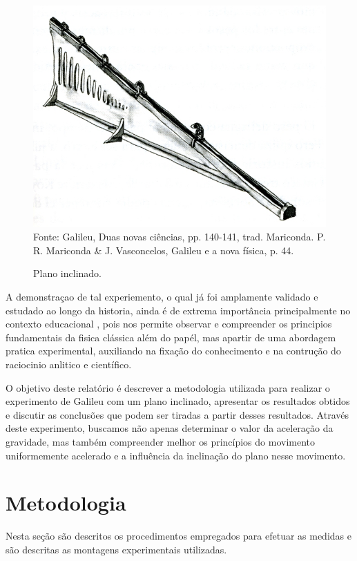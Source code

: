 \documentclass[a4paper, 12pt]{article}
\begin{document}
\begin{figure}[!htpb]
	\centering
	\caption{Plano inclinado.}
	\includegraphics[scale=0.25]{./pictures/planoInclinado.png}
	Fonte: Galileu, Duas novas ciências, pp. 140-141, trad. Mariconda. P. R. Mariconda \& J. Vasconcelos, Galileu e a nova física, p. 44.
\end{figure}

A demonstraçao de tal experiemento, o qual já foi amplamente validado e estudado ao longo da historia, ainda é de extrema importância principalmente no contexto educacional \cite{Silva2023}, pois nos permite observar e compreender os principios fundamentais da fisica clássica além do papél, mas apartir de uma abordagem pratica experimental, auxiliando na fixação do conhecimento e na contrução do raciocinio anlitico e científico.

O objetivo deste relatório é descrever a metodologia utilizada para realizar o experimento de Galileu com um plano inclinado, apresentar os resultados obtidos e discutir as conclusões que podem ser tiradas a partir desses resultados. Através deste experimento, buscamos não apenas determinar o valor da aceleração da gravidade, mas também compreender melhor os princípios do movimento uniformemente acelerado e a influência da inclinação do plano nesse movimento.


\section{Metodologia}
Nesta seção são descritos os procedimentos empregados para efetuar as medidas e são descritas as montagens experimentais utilizadas.
\end{document}
